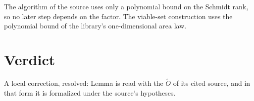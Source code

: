 \documentclass{article}
\begin{document}
The algorithm of the source uses only a polynomial bound on the Schmidt
rank, so no later step depends on the factor. The viable-set construction
uses the polynomial bound of the library's one-dimensional area law.

\section{Verdict}

A local correction, resolved: Lemma  is read with the
$\tilde O$ of its cited source, and in that form it is formalized under the
source's hypotheses.



\end{document}
